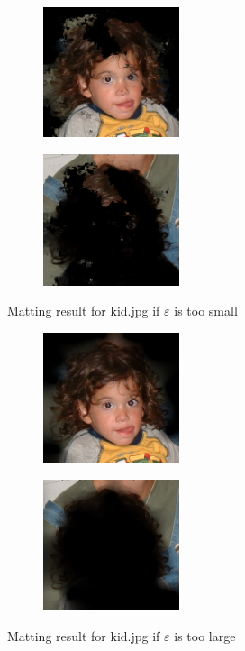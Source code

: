 \documentclass[11pt,letterpaper]{article}
\begin{document}
\begin{figure}[h!]
  \centering
  \begin{subfigure}{0.24\textwidth}
    \centering
    \includegraphics[width=4cm]{./result/kid/smallEpsilon-F.png}
    \caption{}
  \end{subfigure}
  \begin{subfigure}{0.24\textwidth}
    \centering
    \includegraphics[width=4cm]{./result/kid/smallEpsilon-B.png}
    \caption{}
  \end{subfigure}   
  \caption {Matting result for kid.jpg if $\varepsilon$ is too small}
\end{figure}

\begin{figure}[h!]
  \centering
  \begin{subfigure}{0.24\textwidth}
    \centering
    \includegraphics[width=4cm]{./result/kid/largeEpsilon-F.png}
    \caption{}
  \end{subfigure}
  \begin{subfigure}{0.24\textwidth}
    \centering
    \includegraphics[width=4cm]{./result/kid/largeEpsilon-B.png}
    \caption{}
  \end{subfigure}   
  \caption {Matting result for kid.jpg if $\varepsilon$ is too large}
\end{figure}
\end{document}
